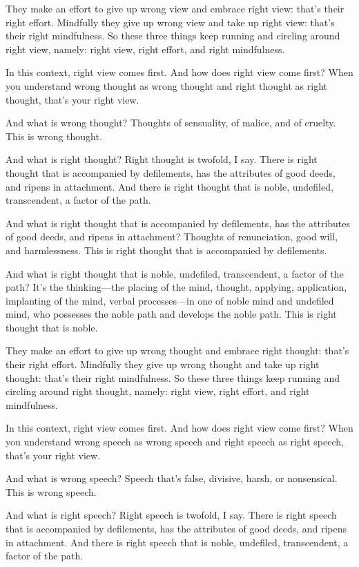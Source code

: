 \documentclass[12pt,openany]{book}%
\begin{document}
They make an effort to give up wrong view and embrace right view: that’s their right effort. Mindfully they give up wrong view and take up right view: that’s their right mindfulness. So these three things keep running and circling around right view, namely: right view, right effort, and right mindfulness. 

In this context, right view comes first. And how does right view come first? When you understand wrong thought as wrong thought and right thought as right thought, that’s your right view. 

And what is wrong thought? Thoughts of sensuality, of malice, and of cruelty. This is wrong thought. 

And what is right thought? Right thought is twofold, I say. There is right thought that is accompanied by defilements, has the attributes of good deeds, and ripens in attachment. And there is right thought that is noble, undefiled, transcendent, a factor of the path. 

And what is right thought that is accompanied by defilements, has the attributes of good deeds, and ripens in attachment? Thoughts of renunciation, good will, and harmlessness. This is right thought that is accompanied by defilements. 

And what is right thought that is noble, undefiled, transcendent, a factor of the path? It’s the thinking—the placing of the mind, thought, applying, application, implanting of the mind, verbal processes—in one of noble mind and undefiled mind, who possesses the noble path and develops the noble path. This is right thought that is noble. 

They make an effort to give up wrong thought and embrace right thought: that’s their right effort. Mindfully they give up wrong thought and take up right thought: that’s their right mindfulness. So these three things keep running and circling around right thought, namely: right view, right effort, and right mindfulness. 

In this context, right view comes first. And how does right view come first? When you understand wrong speech as wrong speech and right speech as right speech, that’s your right view. 

And what is wrong speech? Speech that’s false, divisive, harsh, or nonsensical. This is wrong speech. 

And what is right speech? Right speech is twofold, I say. There is right speech that is accompanied by defilements, has the attributes of good deeds, and ripens in attachment. And there is right speech that is noble, undefiled, transcendent, a factor of the path. 
\end{document}

